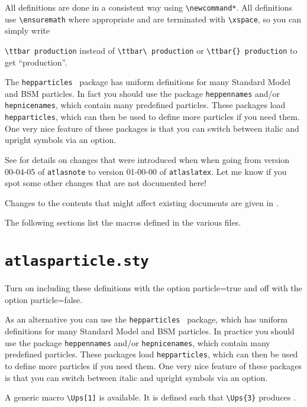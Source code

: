 \documentclass[UKenglish,texlive=2013]{\ATLASLATEXPATH atlasdoc}
\newcommand{\File}[1]{\texttt{#1}\xspace}
\newcommand{\Option}[1]{\textsf{#1}\xspace}
\newcommand{\Package}[1]{\texttt{#1}\xspace}
\begin{document}
All definitions are done in a consistent way using \verb|\newcommand*|.
All definitions use \verb|\ensuremath| where appropriate and are terminated with
\verb|\xspace|, so you can simply write {\verb|\ttbar production| instead of
\verb|\ttbar\ production| or \verb|\ttbar{} production| to get \enquote{\ttbar production}.

The \Package{hepparticles}~\cite{hepparticles} package has uniform definitions for many Standard Model and BSM particles.
In fact you should use the package \Package{heppennames} and/or \Package{hepnicenames},
which contain many predefined particles.
These packages load \Package{hepparticles}, which can then be used to define more particles if you need them.
One very nice feature of these packages is that you can switch between italic and upright symbols via an option.

See \Sect{\ref{sec:old}} for details on changes that were introduced when
when going from version 00-04-05 of \Package{atlasnote}
to version 01-00-00 of \Package{atlaslatex}.
Let me know if you spot some other changes that are not documented here!

Changes to the contents that might affect existing documents are given in \Sect{\ref{sec:change}}.

The following sections list the macros defined in the various files.

\twocolumn
\section{\File{atlasparticle.sty}}

Turn on including these definitions with the option \Option{particle=true} and off with the option \Option{particle=false}.

As an alternative you can use the \Package{hepparticles}~\cite{hepparticles} package,
which has uniform definitions for many Standard Model and BSM particles.
In practice you should use the package \Package{heppennames} and/or \Package{hepnicenames},
which contain many predefined particles.
These packages load \Package{hepparticles}, which can then be used to define more particles if you need them.
One very nice feature of these packages is that you can switch between italic and upright symbols via an option.



A generic macro \verb|\Ups[1]| is available.
It is defined such that \verb|\Ups{3}| produces .


}
\end{document}

